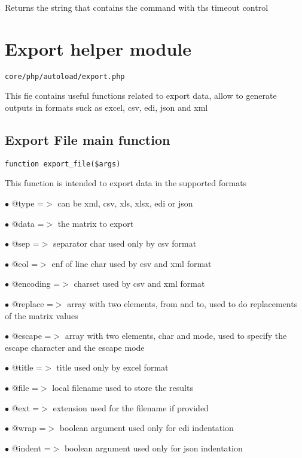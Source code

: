 \documentclass[a4paper]{book}
\begin{document}
Returns the string that contains the command with ths timeout control

\hypertarget{toc113}{}
\section{Export helper module}

\begin{lstlisting}
core/php/autoload/export.php
\end{lstlisting}

This fie contains useful functions related to export data, allow to generate outputs in formats
suck as excel, csv, edi, json and xml

\hypertarget{toc114}{}
\subsection{Export File main function}

\begin{lstlisting}
function export_file($args)
\end{lstlisting}

This function is intended to export data in the supported formats

\begin{compactitem}
\item[\color{myblue}$\bullet$] @type     =$>$ can be xml, csv, xls, xlsx, edi or json
\item[\color{myblue}$\bullet$] @data     =$>$ the matrix to export
\item[\color{myblue}$\bullet$] @sep      =$>$ separator char used only by csv format
\item[\color{myblue}$\bullet$] @eol      =$>$ enf of line char used by csv and xml format
\item[\color{myblue}$\bullet$] @encoding =$>$ charset used by csv and xml format
\item[\color{myblue}$\bullet$] @replace  =$>$ array with two elements, from and to, used to do replacements of the matrix values
\item[\color{myblue}$\bullet$] @escape   =$>$ array with two elements, char and mode, used to specify the escape character and the
             escape mode
\item[\color{myblue}$\bullet$] @title    =$>$ title used only by excel format
\item[\color{myblue}$\bullet$] @file     =$>$ local filename used to store the results
\item[\color{myblue}$\bullet$] @ext      =$>$ extension used for the filename if provided
\item[\color{myblue}$\bullet$] @wrap     =$>$ boolean argument used only for edi indentation
\item[\color{myblue}$\bullet$] @indent   =$>$ boolean argument used only for json indentation
\end{compactitem}
\end{document}
